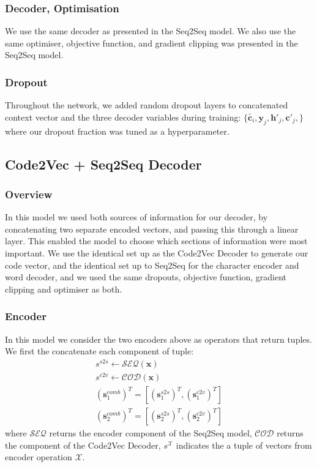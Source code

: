 \subsubsection{Decoder, Optimisation}

We use the same decoder as presented in the Seq2Seq model.
We also use the same optimiser, objective function, and gradient clipping was presented in the Seq2Seq model.

\subsubsection{Dropout}

Throughout the network, we added random dropout layers to concatenated context vector and the three decoder variables during training:
$\{\tilde{\textbf{c}_i}, \textbf{y}_j, \textbf{h}'_j,  \textbf{c}'_j,\}$
where our dropout fraction was tuned as a hyperparameter. 


\subsection{Code2Vec + Seq2Seq Decoder} %
\label{sub:code2vec_sequence_to_sequence}

\subsubsection{Overview}

In this model we used both sources of information for our decoder, by concatenating two separate encoded vectors, and passing this through a linear layer. 
This enabled the model to choose which sections of information were most important.
We use the identical set up as the Code2Vec Decoder to generate our code vector, and the identical set up to Seq2Seq for the character encoder and word decoder, and we used the same dropouts, objective function, gradient clipping and optimiser as both.

\subsubsection{Encoder}

In this model we consider the two encoders above as operators that return tuples. We first the concatenate each component of tuple:
\begin{align}
    s^{s2s}  \gets \mathcal{SEQ}(\mathbf{x}) \\
    s^{c2v} \gets \mathcal{COD}(\mathbf{x}) \\
    (\mathbf{s}_1^{comb})^T = [ (\mathbf{s}^{s2s}_1)^T , (\mathbf{s}^{c2v}_1)^T ] \\
    (\mathbf{s}_2^{comb})^T  =  [ (\mathbf{s}^{s2s}_2)^T , (\mathbf{s}^{c2v}_2)^T ]  
\end{align}
where $\mathcal{SEQ}$ returns the encoder component of the Seq2Seq model,
$\mathcal{COD}$ returns the component of the Code2Vec Decoder, 
$s^\mathcal{X}$ indicates the a tuple of vectors from encoder operation $\mathcal{X}$.

